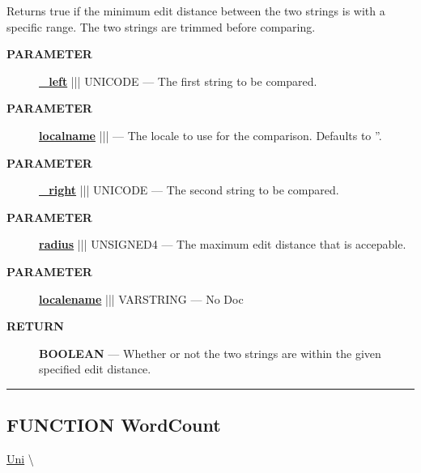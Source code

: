 \par





Returns true if the minimum edit distance between the two strings is with a specific range. The two strings are trimmed before comparing.






\par
\begin{description}
\item [\colorbox{tagtype}{\color{white} \textbf{\textsf{PARAMETER}}}] \textbf{\underline{\_left}} ||| UNICODE --- The first string to be compared.
\item [\colorbox{tagtype}{\color{white} \textbf{\textsf{PARAMETER}}}] \textbf{\underline{localname}} |||  --- The locale to use for the comparison. Defaults to ''.
\item [\colorbox{tagtype}{\color{white} \textbf{\textsf{PARAMETER}}}] \textbf{\underline{\_right}} ||| UNICODE --- The second string to be compared.
\item [\colorbox{tagtype}{\color{white} \textbf{\textsf{PARAMETER}}}] \textbf{\underline{radius}} ||| UNSIGNED4 --- The maximum edit distance that is accepable.
\item [\colorbox{tagtype}{\color{white} \textbf{\textsf{PARAMETER}}}] \textbf{\underline{localename}} ||| VARSTRING --- No Doc
\end{description}







\par
\begin{description}
\item [\colorbox{tagtype}{\color{white} \textbf{\textsf{RETURN}}}] \textbf{BOOLEAN} --- Whether or not the two strings are within the given specified edit distance.
\end{description}




\rule{\linewidth}{0.5pt}
\subsection*{\textsf{\colorbox{headtoc}{\color{white} FUNCTION}
WordCount}}

\hypertarget{ecldoc:uni.wordcount}{}
\hspace{0pt} \hyperlink{ecldoc:Uni}{Uni} \textbackslash 

